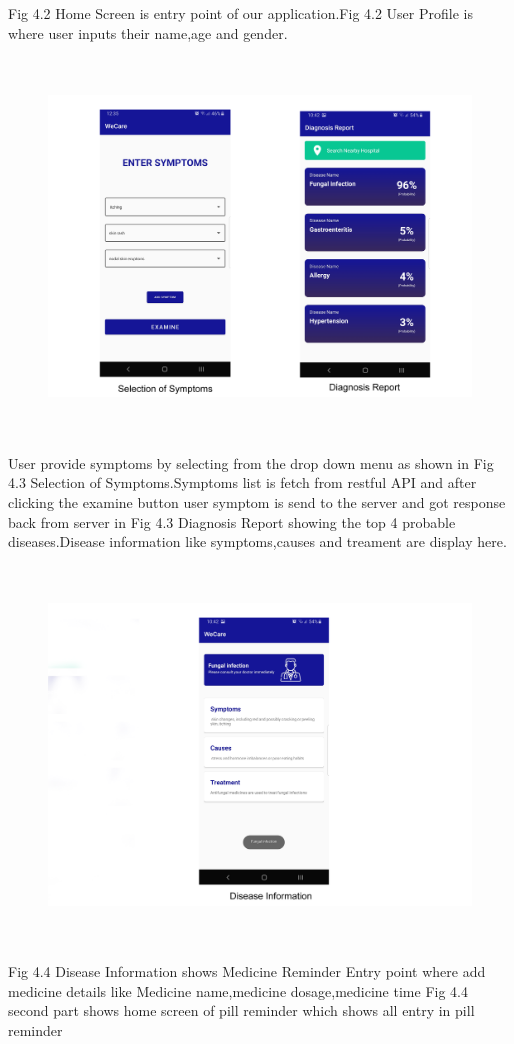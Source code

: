 Fig 4.2 Home Screen is entry point of our application.Fig 4.2 User Profile is where user inputs their name,age and gender.

\begin{figure}[H]
\begin{center}
\includegraphics[width=145mm, height = 100mm]{Outputnew/2.png}
\caption{}
\end{center}
\end{figure}

User provide symptoms by selecting from the drop down menu as shown in Fig 4.3 Selection of Symptoms.Symptoms list is fetch from restful API and after clicking the examine button user symptom is send to the server and got response back from server in Fig 4.3 Diagnosis Report showing the top 4 probable diseases.Disease information like symptoms,causes and treament are display here.

\begin{figure}[H]
\begin{center}
\includegraphics[width=145mm, height = 100mm]{Outputnew/3.png}
\caption{}
\end{center}
\end{figure}
Fig 4.4 Disease Information shows  Medicine Reminder Entry point where add medicine details like Medicine name,medicine dosage,medicine time 
Fig 4.4 second part shows home screen of pill reminder which shows all entry in pill reminder



